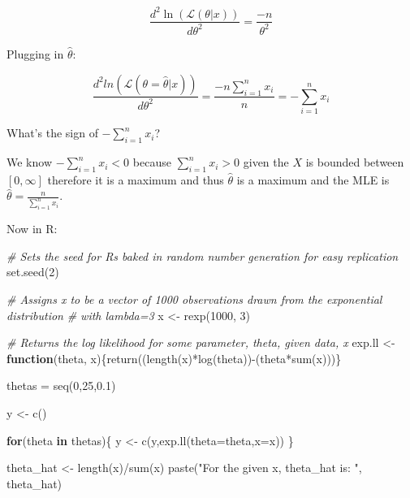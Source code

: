 \documentclass[
]{article}
\newenvironment{Shaded}{\begin{snugshade}}{\end{snugshade}}
\newcommand{\AttributeTok}[1]{\textcolor[rgb]{0.77,0.63,0.00}{#1}}
\newcommand{\CommentTok}[1]{\textcolor[rgb]{0.56,0.35,0.01}{\textit{#1}}}
\newcommand{\ControlFlowTok}[1]{\textcolor[rgb]{0.13,0.29,0.53}{\textbf{#1}}}
\newcommand{\DecValTok}[1]{\textcolor[rgb]{0.00,0.00,0.81}{#1}}
\newcommand{\FloatTok}[1]{\textcolor[rgb]{0.00,0.00,0.81}{#1}}
\newcommand{\FunctionTok}[1]{\textcolor[rgb]{0.00,0.00,0.00}{#1}}
\newcommand{\NormalTok}[1]{#1}
\newcommand{\OtherTok}[1]{\textcolor[rgb]{0.56,0.35,0.01}{#1}}
\newcommand{\SpecialCharTok}[1]{\textcolor[rgb]{0.00,0.00,0.00}{#1}}
\newcommand{\StringTok}[1]{\textcolor[rgb]{0.31,0.60,0.02}{#1}}
\begin{document}
\[\frac{d^2\ln(\mathcal{L}(\theta|x))}{d\theta^2}=\frac{-n}{\theta^2}\]

Plugging in \(\hat{\theta}\):

\[\frac{d^2ln(\mathcal{L}(\theta=\hat{\theta}|x))}{d\theta^2}=\frac{-n\sum_{i=1}^nx_i}{n}=-\sum_{i=1}^nx_i\]

What's the sign of \(-\sum_{i=1}^nx_i\)?

We know \(-\sum_{i=1}^nx_i<0\) because \(\sum_{i=1}^nx_i>0\) given the
\(X\) is bounded between \([0, \infty]\) therefore it is a maximum and
thus \(\hat{\theta}\) is a maximum and the MLE is
\(\hat{\theta}=\frac{n}{\sum_{i=1}^nx_i}\).

Now in R:

\begin{Shaded}
\begin{Highlighting}[]
\CommentTok{\# Sets the seed for R\textquotesingle{}s baked in random number generation for easy replication}
\FunctionTok{set.seed}\NormalTok{(}\DecValTok{2}\NormalTok{)}

\CommentTok{\# Assigns x to be a vector of 1000 observations drawn from the exponential distribution}
\CommentTok{\# with lambda=3}
\NormalTok{x }\OtherTok{\textless{}{-}} \FunctionTok{rexp}\NormalTok{(}\DecValTok{1000}\NormalTok{, }\DecValTok{3}\NormalTok{)}

\CommentTok{\# Returns the log likelihood for some parameter, theta, given data, x}
\NormalTok{exp.ll }\OtherTok{\textless{}{-}} \ControlFlowTok{function}\NormalTok{(theta, x)\{}\FunctionTok{return}\NormalTok{((}\FunctionTok{length}\NormalTok{(x)}\SpecialCharTok{*}\FunctionTok{log}\NormalTok{(theta))}\SpecialCharTok{{-}}\NormalTok{(theta}\SpecialCharTok{*}\FunctionTok{sum}\NormalTok{(x)))\}}

\NormalTok{thetas }\OtherTok{=} \FunctionTok{seq}\NormalTok{(}\DecValTok{0}\NormalTok{,}\DecValTok{25}\NormalTok{,}\FloatTok{0.1}\NormalTok{)}

\NormalTok{y }\OtherTok{\textless{}{-}} \FunctionTok{c}\NormalTok{()}

\ControlFlowTok{for}\NormalTok{(theta }\ControlFlowTok{in}\NormalTok{ thetas)\{}
\NormalTok{  y }\OtherTok{\textless{}{-}} \FunctionTok{c}\NormalTok{(y,}\FunctionTok{exp.ll}\NormalTok{(}\AttributeTok{theta=}\NormalTok{theta,}\AttributeTok{x=}\NormalTok{x))}
\NormalTok{\}}

\NormalTok{theta\_hat }\OtherTok{\textless{}{-}} \FunctionTok{length}\NormalTok{(x)}\SpecialCharTok{/}\FunctionTok{sum}\NormalTok{(x)}
\FunctionTok{paste}\NormalTok{(}\StringTok{"For the given x, theta\_hat is: "}\NormalTok{, theta\_hat)}
\end{Highlighting}
\end{Shaded}
\end{document}
